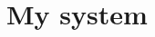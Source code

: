 \documentclass[12pt,a4paper,oneside]{article}
\numberwithin{equation}{section}   		%
\begin{document}



\section{My system}








\newpage



%
\end{document}
